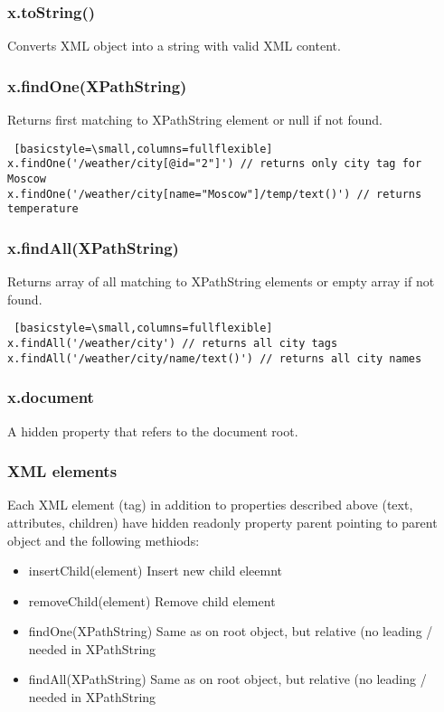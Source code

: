\subsubsection{x.toString()}
Converts XML object into a string with valid XML content.

\subsubsection{x.findOne(XPathString)}
Returns first matching to XPathString element or null if not found.

\begin{lstlisting} [basicstyle=\small,columns=fullflexible]
x.findOne('/weather/city[@id="2"]') // returns only city tag for Moscow
x.findOne('/weather/city[name="Moscow"]/temp/text()') // returns temperature 
\end{lstlisting}

\subsubsection{x.findAll(XPathString)}
Returns array of all matching to XPathString elements or empty array if not found.

\begin{lstlisting} [basicstyle=\small,columns=fullflexible]
x.findAll('/weather/city') // returns all city tags
x.findAll('/weather/city/name/text()') // returns all city names
\end{lstlisting}

\subsubsection{x.document}
A hidden property that refers to the document root.

\subsubsection{XML elements}
Each XML element (tag) in addition to properties described above (text, attributes, 
children) have hidden readonly property parent pointing to parent object and the following methiods:
\begin{itemize}
\item insertChild(element) Insert new child eleemnt
\item removeChild(element) Remove child element
\item findOne(XPathString) Same as on root object, but relative (no leading / needed in XPathString
\item findAll(XPathString) Same as on root object, but relative (no leading / needed in XPathString
\end{itemize}

